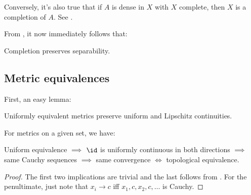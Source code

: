 	\begin{rmk}
		Conversely, it's also true that if $A$ is dense in $X$ with $X$ complete, then $X$ is a completion of $A$. See .
	\end{rmk}
	
	
	From , it now immediately follows that:
	
	\begin{cor}
		Completion preserves separability.
	\end{cor}
	
	
\subsection{Metric equivalences}

First, an easy lemma:

	\begin{lem}
		Uniformly equivalent metrics preserve uniform and Lipschitz continuities.
	\end{lem}
	

	\begin{prp}
		For metrics on a given set, we have:
		\begin{center}
			Uniform equivalence $\implies$ $\id$ is uniformly continuous in both directions $\implies$ same Cauchy sequences $\implies$ same convergence $\iff$ topological equivalence.
		\end{center}
	\end{prp}
	
	\begin{proof}
		The first two implications are trivial and the last follows from . For the penultimate, just note that $x_i\to c$ iff $x_1, c, x_2, c, \ldots$ is Cauchy.
	\end{proof}
	

